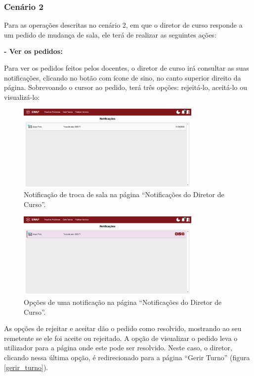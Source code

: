 \documentclass[12pt, a4paper]{article}
\begin{document}
\subsubsection{Cenário 2}

Para as operações descritas no cenário 2, em que o diretor de curso responde a um pedido de mudança
de sala, ele terá de realizar as seguintes ações:

\textbf{- Ver os pedidos:}

Para ver os pedidos feitos pelos docentes, o diretor de curso irá consultar as suas notificações,
clicando no botão com ícone de sino, no canto superior direito da página. Sobrevoando o cursor ao
pedido, terá três opções: rejeitá-lo, aceitá-lo ou visualizá-lo:

\begin{figure}[H]
    \centering
    \includegraphics[width=0.8\textwidth]{res/manual/notificacao_troca_sala.png}
    \caption{Notificação de troca de sala na página ``Notificações do Diretor de Curso''.}
    \label{notificacao_troca_sala}
\end{figure}

\begin{figure}[H]
    \centering
    \includegraphics[width=0.8\textwidth]{res/manual/notificacao_troca_sala_hover.png}
    \caption{Opções de uma notificação na página ``Notificações do Diretor de Curso''.}
    \label{notificacao_troca_sala_hover}
\end{figure}

As opções de rejeitar e aceitar dão o pedido como resolvido, mostrando ao seu remetente se ele foi
aceite ou rejeitado. A opção de visualizar o pedido leva o utilizador para a página onde este pode
ser resolvido. Neste caso, o diretor, clicando nessa última opção, é redirecionado para a página
``Gerir Turno'' (figura \ref{gerir_turno}).
\end{document}
